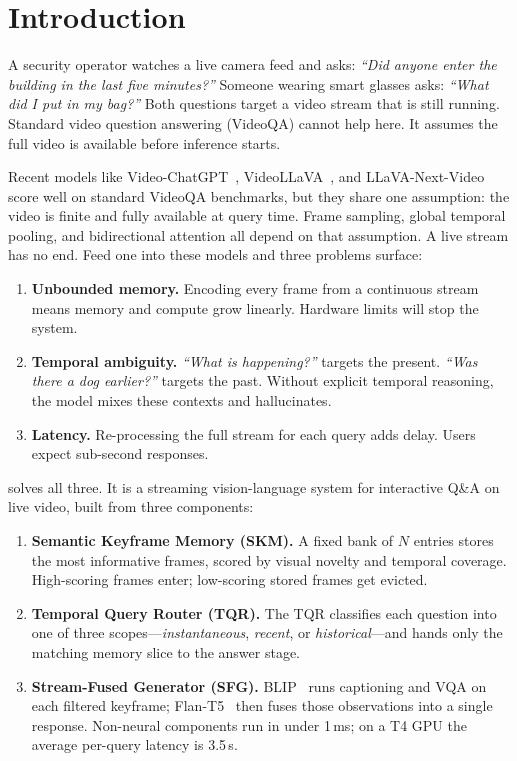 \section{Introduction}
\label{sec:intro}

A security operator watches a live camera feed and asks: \emph{``Did anyone enter the building in the last five minutes?''}
Someone wearing smart glasses asks: \emph{``What did I put in my bag?''}
Both questions target a video stream that is still running. Standard video question answering (VideoQA) cannot help here. It assumes the full video is available before inference starts.

Recent models like Video-ChatGPT~\cite{maaz2023videochatgpt}, VideoLLaVA~\cite{lin2023videollava}, and LLaVA-Next-Video~\cite{zhang2024llavanextvideo} score well on standard VideoQA benchmarks, but they share one assumption: the video is finite and fully available at query time.
Frame sampling, global temporal pooling, and bidirectional attention all depend on that assumption.
A live stream has no end. Feed one into these models and three problems surface:

\begin{enumerate}[leftmargin=*,itemsep=2pt]
    \item \textbf{Unbounded memory.} Encoding every frame from a continuous stream means memory and compute grow linearly. Hardware limits will stop the system.
    \item \textbf{Temporal ambiguity.} \emph{``What is happening?''} targets the present. \emph{``Was there a dog earlier?''} targets the past. Without explicit temporal reasoning, the model mixes these contexts and hallucinates.
    \item \textbf{Latency.} Re-processing the full stream for each query adds delay. Users expect sub-second responses.
\end{enumerate}

\textbf{\ours} solves all three. It is a streaming vision-language system for interactive Q\&A on live video, built from three components:

\begin{enumerate}[leftmargin=*,itemsep=2pt]
    \item \textbf{Semantic Keyframe Memory (SKM).}
    A fixed bank of $N$ entries stores the most informative frames, scored by visual novelty and temporal coverage. High-scoring frames enter; low-scoring stored frames get evicted.

    \item \textbf{Temporal Query Router (TQR).}
    The TQR classifies each question into one of three scopes---\emph{instantaneous}, \emph{recent}, or \emph{historical}---and hands only the matching memory slice to the answer stage.

    \item \textbf{Stream-Fused Generator (SFG).}
    BLIP~\cite{li2022blip} runs captioning and VQA on each filtered keyframe; Flan-T5~\cite{chung2022flanT5} then fuses those observations into a single response.
    Non-neural components run in under 1\,ms; on a T4 GPU the average per-query latency is 3.5\,s.
\end{enumerate}

